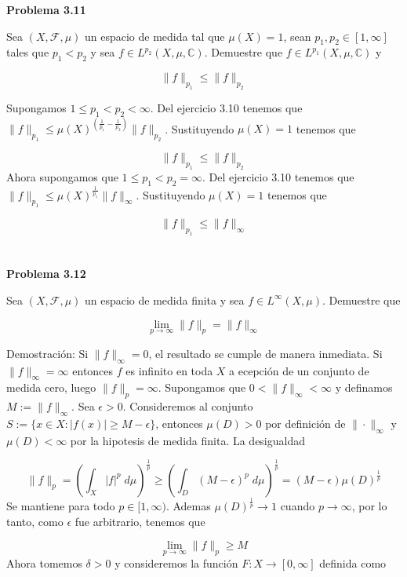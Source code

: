 \documentclass[12pt]{article}
\begin{document}
    \textbf{Problema 3.11}

    Sea $(X,\mathcal{F},\mu)$ un espacio de medida tal que 
    $\mu(X) = 1$, sean $p_1,p_2\in [1,\infty]$ tales que $p_1 < p_2$ y sea 
    $f\in L^{p_2}(X,\mu,\mathbb{C})$. Demuestre que $f\in L^{p_1}(X,\mu,\mathbb{C})$ y
    
    \[\|f\|_{p_1} \leq \|f\|_{p_2}\]
    
    Supongamos $1 \leq p_1 < p_2 < \infty$. Del ejercicio 3.10 tenemos que 
    $\|f\|_{p_1} \leq \mu(X)^{\left(\frac{1}{p_1}-\frac{1}{p_2}\right)}\|f\|_{p_2}$. 
    Sustituyendo $\mu(X) = 1$ tenemos que 

    \[\|f\|_{p_1} \leq \|f\|_{p_2}\]
    Ahora supongamos que $1 \leq p_1 < p_2 = \infty$. Del ejercicio 3.10 tenemos que 
    $\|f\|_{p_1} \leq \mu(X)^{\frac{1}{p_1}}\|f\|_{\infty}$. Sustituyendo $\mu(X) = 1$
    tenemos que 

    \[\|f\|_{p_1} \leq \|f\|_{\infty}\]
    \\ \\

    \textbf{Problema 3.12}

    Sea $(X,\mathcal{F},\mu)$ un espacio de medida finita y sea $f\in L^{\infty}(X,\mu)$. 
    Demuestre que 

    \[\lim_{p\rightarrow \infty}\|f\|_{p} = \|f\|_{\infty}\]

    Demostraci\'on: Si $\|f\|_{\infty} = 0$, el resultado se cumple de manera inmediata.
    Si $\|f\|_{\infty} = \infty$ entonces $f$ es infinito en toda $X$ a ecepci\'on de un 
    conjunto de medida cero, luego $\|f\|_p = \infty$.
    Supongamos que $0 < \|f\|_{\infty} < \infty$ y definamos $M := \|f\|_{\infty}$. Sea 
    $\epsilon > 0$. Consideremos al conjunto $S := \{x\in X : |f(x)| \geq M-\epsilon\}$, entonces 
    $\mu(D) > 0$ por definici\'on de $\|\cdot\|_{\infty}$ y $\mu(D) < \infty$ por la 
    hipotesis de medida finita. La desigualdad

    \[\|f\|_p = \left( \int_X |f|^p\;d\mu \right)^{\frac{1}{p}} \geq \left( \int_D (M-\epsilon)^p\;d\mu \right)^{\frac{1}{p}} = (M-\epsilon)\mu(D)^{\frac{1}{p}}\]
    Se mantiene para todo $p\in [1,\infty)$. Ademas $\mu(D)^{\frac{1}{p}}\rightarrow 1$ 
    cuando $p\rightarrow \infty$, por lo tanto, como $\epsilon$ fue arbitrario, tenemos que  

    \[\lim_{p\rightarrow \infty} \|f\|_p \geq M\]
    Ahora tomemos $\delta > 0$ y consideremos la funci\'on $F:X\rightarrow [0,\infty]$
    definida como
\end{document}
